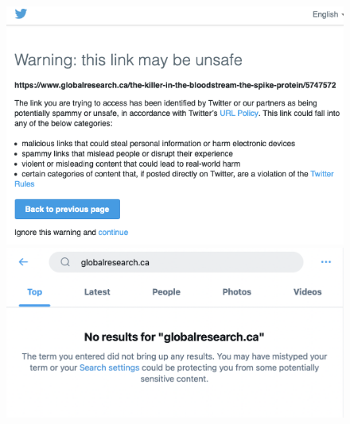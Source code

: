 \documentclass[11pt,a4paper]{article}
\begin{document}
\begin{figure}
\begin{multicols}{1}
    \includegraphics[scale=0.33]{./img/globalresearch/warning.png}\par
    \includegraphics[scale=0.33]{./img/globalresearch_14_06_2021_16pm_UTC.png}\par
\end{multicols}

%
\caption{ 
 }
\label{fig4}
\end{figure}


\end{document}
